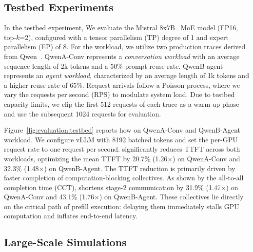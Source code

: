 \subsection{Testbed Experiments}
\label{sec:evaluation:testbed}






In the testbed experiment, We evaluate the Mistral 8x7B~\cite{mixtral7b} MoE model (FP16, top-$k$=2), configured with a tensor parallelism (TP) degree of 1 and expert parallelism (EP) of 8. For the workload, we utilize two production traces derived from Qwen~\cite{qwen_bailian_traces}. QwenA-Conv represents a \textit{conversation workload} with an average sequence length of 2k tokens and a 50\% prompt reuse rate. QwenB-agent represents an \textit{agent workload}, characterized by an average length of 1k tokens and a higher reuse rate of 65\%. Request arrivals follow a Poisson process, where we vary the requests per second (RPS) to modulate system load. Due to testbed capacity limits, we clip the first 512 requests of each trace as a warm-up phase and use the subsequent 1024 requests for evaluation.

Figure~\ref{fig:evaluation:testbed} reports how \sys{} on QwenA-Conv and QwenB-Agent workload. We configure vLLM with 8192 batched tokens and set the per-GPU request rate to one request per second. \sys{} significantly reduces TTFT across both workloads, optimizing the mean TTFT by 20.7\% (1.26×) on QwenA-Conv and 32.3\% (1.48×) on QwenB-Agent. The TTFT reduction is primarily driven by faster completion of computation-blocking collectives. As shown by the all-to-all completion time (CCT), \sys{} shortens stage-2 communication by 31.9\% (1.47×) on QwenA-Conv and 43.1\% (1.76×) on QwenB-Agent. These collectives lie directly on the critical path of prefill execution: delaying them immediately stalls GPU computation and inflates end-to-end latency.


\subsection{Large-Scale Simulations}

